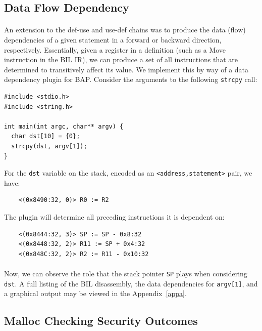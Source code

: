 \documentclass[letterpaper,11pt]{article}
\begin{document}
\subsection{Data Flow Dependency}

\paragraph{}
An extension to the def-use and use-def chains was to produce the data (flow)
dependencies of a given statement in a forward or backward direction,
respectively. Essentially, given a register in a definition (such as a Move
instruction in the BIL IR), we can produce a set of all instructions that are
determined to transitively affect its value. We implement this
by way of a data dependency plugin for BAP. Consider the arguments to the
following \texttt{strcpy} call:

\begin{center}
\lstset{language=C, label=strcpy,
caption=strcpy.c, breaklines=true, basicstyle=\tiny, numbers=none}
\begin{lstlisting}
#include <stdio.h>
#include <string.h>

int main(int argc, char** argv) {
  char dst[10] = {0};
  strcpy(dst, argv[1]);
}
\end{lstlisting}
\end{center}

For the \texttt{dst} variable on the stack, encoded as an
\texttt{<address,statement>} pair, we have:

\begin{verbatim}
    <(0x8490:32, 0)> R0 := R2 
\end{verbatim}

The plugin will determine all preceding instructions it is dependent on:
\begin{verbatim}
    <(0x8444:32, 3)> SP := SP - 0x8:32
    <(0x8448:32, 2)> R11 := SP + 0x4:32
    <(0x848C:32, 2)> R2 := R11 - 0x10:32
\end{verbatim}

\paragraph{}
Now, we can observe the role that the stack pointer \texttt{SP} plays
when considering \texttt{dst}. A full listing of the BIL disassembly,
the data dependencies for \texttt{argv[1]}, and a graphical
output may be viewed in
the Appendix~\ref{appa}.

\subsection{Malloc Checking Security Outcomes}
\end{document}
